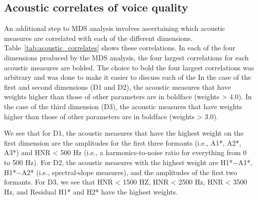 \subsection{Acoustic correlates of voice quality} \label{sec:acousticlandscape:correlates}

An additional step to MDS analysis involves ascertaining which acoustic measures are correlated with each of the different dimensions. Table~\ref{tab:acoustic_correlates} shows these correlations. In each of the four dimensions produced by the MDS analysis, the four largest correlations for each acoustic measures are bolded. The choice to bold the four largest correlations was arbitrary and was done to make it easier to discuss each of the In the case of the first and second dimensions (D1 and D2), the acoustic measures that have weights higher than those of other parameters are in boldface (weights > 4.0). In the case of the third dimension (D3), the acoustic measures that have weights higher than those of other parameters are in boldface (weights > 3.0). 

We see that for D1, the acoustic measures that have the highest weight on the first dimension are the amplitudes for the first three formants (i.e., A1*, A2*, A3*) and HNR < 500 Hz (i.e., a harmonics-to-noise ratio for everything from 0 to 500 Hz). For D2, the acoustic measures with the highest weight are H1*$-$A1*, H1*$-$A2* (i.e., spectral-slope measures), and the amplitudes of the first two formants. For D3, we see that HNR < 1500 HZ, HNR < 2500 Hz, HNR < 3500 Hz, and Residual H1* and H2* have the highest weights.



